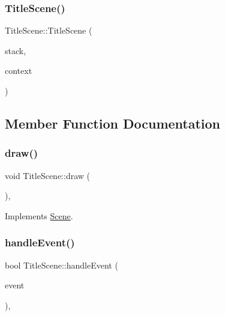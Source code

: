 \subsubsection{\texorpdfstring{Title\+Scene()}{TitleScene()}}
{\footnotesize\ttfamily Title\+Scene\+::\+Title\+Scene (\begin{DoxyParamCaption}\item[{\hyperlink{class_scene_stack}{Scene\+Stack} \&}]{stack,  }\item[{\hyperlink{struct_scene_1_1_context}{Context}}]{context }\end{DoxyParamCaption})}



\subsection{Member Function Documentation}
\mbox{\label{class_title_scene_a3e527255771f75a41c4fe8aaa35999dd}} 
\subsubsection{\texorpdfstring{draw()}{draw()}}
{\footnotesize\ttfamily void Title\+Scene\+::draw (\begin{DoxyParamCaption}{ }\end{DoxyParamCaption})\hspace{0.3cm}{\ttfamily [override]}, {\ttfamily [virtual]}}



Implements \hyperlink{class_scene_a789c16961aa1e316b2a4a05b95187546}{Scene}.

\mbox{\label{class_title_scene_a1f019a83309ce967883b4b4d76b816af}} 
\subsubsection{\texorpdfstring{handle\+Event()}{handleEvent()}}
{\footnotesize\ttfamily bool Title\+Scene\+::handle\+Event (\begin{DoxyParamCaption}\item[{const sf\+::\+Event \&}]{event }\end{DoxyParamCaption})\hspace{0.3cm}{\ttfamily [override]}, {\ttfamily [virtual]}}



